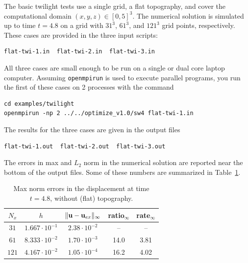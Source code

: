 \documentclass[11pt]{report}
\newcommand{\ub}{{\bf u}}
\begin{document}
The basic twilight tests use a single grid, a flat topography, and cover the computational domain
$(x,y,z)\in[0,5]^3$. The numerical solution is simulated up to time $t=4.8$ on a grid with $31^3$,
$61^3$, and $121^3$ grid points, respectively. These cases are provided in the three input scripts:
\begin{verbatim}
flat-twi-1.in  flat-twi-2.in  flat-twi-3.in
\end{verbatim}
All three cases are small enough to be run on a single or dual core laptop computer. Assuming
\verb+openmpirun+ is used to execute parallel programs, you run the first of these cases on 2
processes with the command
\begin{verbatim}
cd examples/twilight
openmpirun -np 2 ../../optimize_v1.0/sw4 flat-twi-1.in
\end{verbatim}
The results for the three cases are given in the output files
\begin{verbatim}
flat-twi-1.out  flat-twi-2.out  flat-twi-3.out
\end{verbatim}
The errors in max and $L_2$ norm in the numerical solution are reported near the bottom of the
output files. Some of these numbers are summarized in Table~\ref{tab:twi-err}.
\begin{table}
\begin{center}
\begin{tabular}{| c | c | c | c  | c | }
\hline
$N_x$ & $h$ & $\| \ub - \ub_{ex}\|_\infty$ & ratio$_\infty$ & rate$_\infty$ \\ \hline
$31$  & $1.667\cdot 10^{-1}$  & $2.38\cdot 10^{-2}$ & --   & --   \\ \hline
$61$  & $8.333\cdot 10^{-2}$  & $1.70\cdot 10^{-3}$ & 14.0 & 3.81 \\ \hline
$121$ & $4.167\cdot 10^{-2}$  & $1.05\cdot 10^{-4}$ & 16.2 & 4.02 \\ \hline
\end{tabular}
\caption{Max norm errors in the displacement at time $t=4.8$, without (flat) topography.}
\label{tab:twi-err}
\end{center}
\end{table}
\end{document}
